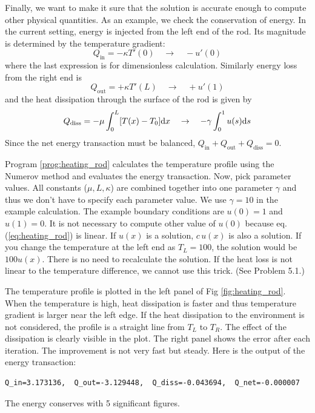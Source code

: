 Finally, we want to make it sure that the solution is accurate enough to compute other physical quantities.  As an example, we check the conservation of energy.  In the current setting, energy is injected from the left end of the rod. Its magnitude is determined by the temperature gradient:
\begin{equation}
Q_\text{in} = -\kappa T'(0) \quad \rightarrow \quad - u'(0)
\end{equation}
where the last expression is for dimensionless calculation.  Similarly energy loss from the right end is
\begin{equation}
Q_\text{out} = +\kappa T'(L)\quad \rightarrow \quad + u'(1) 
\end{equation}
and the heat dissipation through the surface of the rod is given by
\begin{equation}
Q_\text{diss} = - \mu \int_0^L [T(x)-T_0] \text{d} x \quad \rightarrow \quad - \gamma \int_0^1 u(s) \text{d} s
\end{equation}
Since the net energy transaction must be balanced, $Q_\text{in}+Q_\text{out}+Q_\text{diss} =0$.  

Program \ref{prog:heating_rod} calculates the temperature profile using the Numerov method and evaluates the energy transaction. Now, pick parameter values.  All constants ($\mu, L, \kappa$) are combined together into one parameter $\gamma$ and thus we don't have to specify each parameter value.  We use $\gamma=10$ in the example calculation.   The example boundary conditions are $u(0)=1$ and $u(1)=0$. It is not necessary to compute other value of $u(0)$ because eq. (\ref{eq:heating_rod}) is linear.  If $u(x)$ is a solution, $c\, u(x)$ is also a solution.  If you change the temperature at the left end as $T_L=100$, the solution would be $100 u(x)$. There is no need to recalculate the solution.
If the heat loss is not linear to the temperature difference, we cannot use this trick. (See Problem 5.1.) 

The temperature profile is plotted in the left panel of Fig \ref{fig:heating_rod}. When the temperature is high, heat dissipation is faster and thus temperature gradient is larger near the left edge. If the heat dissipation to the environment is not considered, the profile is a straight line from $T_L$ to $T_R$. The effect of the dissipation is clearly visible in the plot. The right panel shows the error after each iteration. The improvement is not very fast but steady.  Here is the output of the energy transaction:

\begin{center}

\begin{minipage}{0.85\textwidth}
\small
\begin{Verbatim}[frame=single]
Q_in=3.173136,  Q_out=-3.129448,  Q_diss=-0.043694,  Q_net=-0.000007
\end{Verbatim}
\end{minipage}
\end{center}
The energy conserves with 5 significant figures.  


